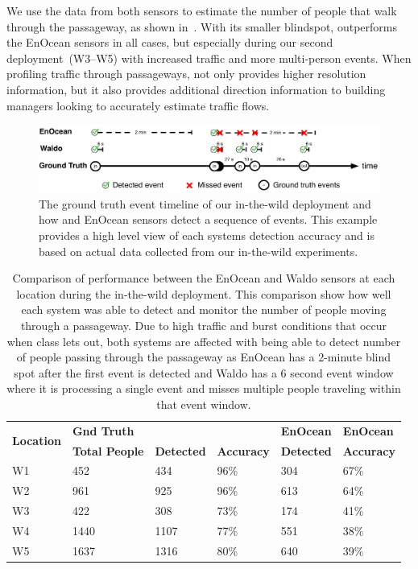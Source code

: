 We use the data from both sensors to estimate the number of people that walk through the passageway, as shown in~.
With its smaller blindspot, \sysname outperforms the EnOcean sensors in all cases, but especially during our second deployment~(W3--W5) with increased traffic and more multi-person events.
When profiling traffic through passageways, \sysname not only provides higher resolution information, but it also provides additional direction information to building managers looking to accurately estimate traffic flows.

\begin{figure}[t]
\centering
\includegraphics[width=0.9\columnwidth]{figs/enocean_v_waldo_v_gt.pdf}
\caption{ The ground truth event timeline of our in-the-wild deployment and how \sysname and EnOcean sensors detect a sequence of events.  This example provides a high level view of each systems detection accuracy and is based on actual data collected from our in-the-wild experiments.  \label{fig:enoceanVwaldo}}
\end{figure}

\begin{table}[t]
\footnotesize
	\begin{tabular}{@{}p{1.0in}p{0.9in}p{0.8in}p{0.7in}p{0.7in}p{0.5in}@{}}
	\toprule
	\multirow{2}{*}{\textbf{Location}}	&	\textbf{Gnd Truth} & \textbf{\sysname} & \textbf{\sysname} & \textbf{EnOcean} 	& \textbf{EnOcean}	\\
	& \textbf{Total People} & \textbf{Detected} & \textbf{Accuracy} &  \textbf{Detected} & \textbf{Accuracy} \\\midrule
	W1 & 452 & 434 & 96\% & 304 & 67\% \\ %
	W2 & 961 & 925 & 96\% & 613 & 64\% \\ %
	W3 & 422 & 308 & 73\% & 174 & 41\% \\	%
        W4 & 1440 & 1107 & 77\% & 551 & 38\% \\ %
	W5 & 1637 & 1316 & 80\% & 640 & 39\% \\ %
	\bottomrule
	\end{tabular}
	\caption{Comparison of performance between the EnOcean and Waldo sensors at each location during the in-the-wild deployment.  This comparison show how well each system was able to detect and monitor the number of people moving through a passageway.  Due to high traffic and burst conditions that occur when class lets out, both systems are affected with being able to detect number of people passing through the passageway as EnOcean has a 2-minute blind spot after the first event is detected and Waldo has a 6 second event window where it is processing a single event and misses multiple people traveling within that event window.
	\vspace{1mm}
	\label{tab:ITWEnOceanVWaldoresults}}

\end{table}

